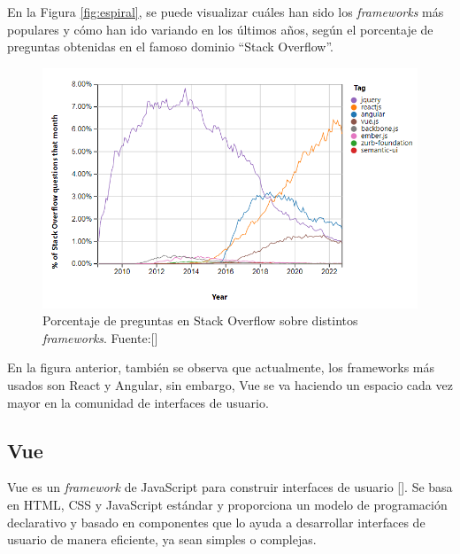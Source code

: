 En la Figura \ref{fig:espiral}, se puede visualizar cuáles han sido los \textit{frameworks} más populares y cómo han ido variando en los últimos años, según el porcentaje de preguntas obtenidas en el famoso dominio ``Stack Overflow''.

\begin{figure}[!h]
\centering
\includegraphics[scale=0.9]{Graphics/stackoverflow}
\caption{Porcentaje de preguntas en Stack Overflow sobre distintos \textit{frameworks}. Fuente:[\cite{50}]}
\label{fig:stackoverflow}
\end{figure}

En la figura anterior, también se observa que actualmente, los frameworks más usados son React y Angular, sin embargo, Vue se va haciendo un espacio cada vez mayor en la comunidad de interfaces de usuario.


\subsection{Vue}
Vue es un \textit{framework} de JavaScript para construir interfaces de usuario [\cite{47}]. Se basa en HTML, CSS y JavaScript estándar y proporciona un modelo de programación declarativo y basado en componentes que lo ayuda a desarrollar interfaces de usuario de manera eficiente, ya sean simples o complejas.

